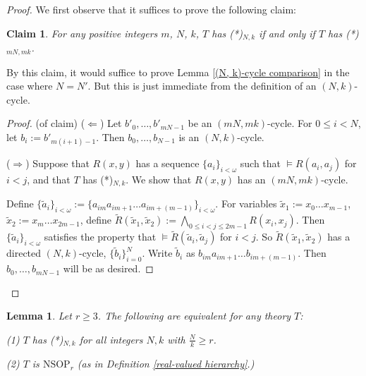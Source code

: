 \documentclass{amsart}
\newtheorem{lemma}[theorem]{Lemma}
\newtheorem{claim}[theorem]{Claim}
\theoremstyle{definition}
\theoremstyle{remark}
\numberwithin{equation}{section}
\begin{document}
\begin{proof}
    We first observe that it suffices to prove the following claim:

    \begin{claim}\label{multiply numerator and denominator}
        For any positive integers $m$, $N$, $k$, $T$ has \emph{(*)}$_{N, k}$ if and only if $T$ has \emph{(*)}$_{mN, mk}$.
    \end{claim}

    By this claim, it would suffice to prove Lemma \ref{(N, k)-cycle comparison} in the case where $N = N'$. But this is just immediate from the definition of an $(N, k)$-cycle.

    \begin{proof}(of claim)
        ($\Leftarrow$) Let $b'_{0}, \ldots, b'_{mN-1}$ be an $(mN, mk)$-cycle. For $0 \leq i < N$, let $b_{i} := b'_{m(i+1) -1} $. Then $b_{0}, \ldots, b_{N-1}$ is an $(N, k)$-cycle.

        ($\Rightarrow$) Suppose that $R(x, y)$ has a sequence $\{a_{i}\}_{i < \omega}$ such that $\models R(a_{i}, a_{j})$ for $i <j$, and that $T$ has (*)$_{N, k}$. We show that $R(x, y)$ has an $(mN, mk)$-cycle.
        
        
        
        Define $\{\tilde{a}_{i}\}_{i < \omega} := \{a_{im}a_{im+1} \ldots a_{im+(m-1)} \}_{i < \omega} $. For variables $\tilde{x}_{1} := x_{0}\ldots x_{m-1} $, $\tilde{x}_{2} := x_{m} \ldots x_{2m-1}$, define $\tilde{R}(\tilde{x}_{1}, \tilde{x}_{2}) := \bigwedge_{0 \leq i < j \leq 2m -1} R(x_{i}, x_{j})$. Then $\{\tilde{a}_{i}\}_{i < \omega}$ satisfies the property that $\models \tilde{R}(\tilde{a}_{i}, \tilde{a}_{j})$ for $i < j$. So $\tilde{R}(\tilde{x}_{1}, \tilde{x}_{2})$ has a directed $(N, k)$-cycle, $\{\tilde{b}_{i}\}^{N}_{i = 0}$. Write $\tilde{b}_{i}$ as $b_{im}a_{im+1} \ldots b_{im+(m-1)}$. Then $b_{0}, \ldots, b_{mN -1} $ will be as desired.
    \end{proof}
\end{proof}

\begin{lemma}\label{finitary and infinitary conditions}
    Let $r \geq 3$. The following are equivalent for any theory $T$:

    (1) $T$ has \emph{(*)}$_{N, k}$ for all integers $N, k$ with $\frac{N}{k} \geq r$.

    (2) $T$ is $\mathrm{NSOP}_{r}$ (as in Definition \ref{real-valued hierarchy}.)
\end{lemma}
\end{document}
